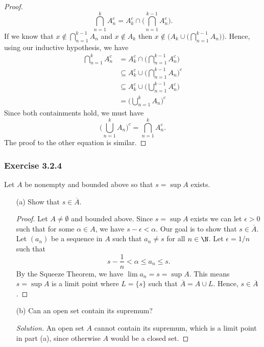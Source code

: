 \begin{proof}
\[ \bigcap_{ n=1 }^{ k } A_n^c = A_k^c \cap \Big( \bigcap_{ n=1 }^{ k-1 } A_{n}^c \Big).  \]
If we know that \( x \notin \bigcap_{ n=1 }^{ k-1 } A_{n} \) and \( x \notin A_k \) then \( x \notin \Big( A_k \cup \Big( \bigcap_{ n=1 }^{ k-1 } A_n \Big) \Big) \). Hence, using our inductive hypothesis, we have
\begin{align*}
    \bigcap_{ n=1 }^{ k } A_n^c &= A_k^c \cap \Big( \bigcap_{ n=1 }^{ k-1 } A_{n}^c \Big)  \\
                                &\subseteq A_k^c \cup \Big( \bigcap_{ n=1 }^{ k-1 } A_n \Big)^c \\ 
                                &\subseteq A_k^c \cup \Big( \bigcup_{ n=1 }^{ k-1 } A_n^c \Big) \\
                                &= \Big( \bigcup_{ n=1 }^{ k } A_n \Big)^c
\end{align*}
Since both containments hold, we must have 
\[ \Big( \bigcup_{ n=1 }^{ k }A_n  \Big)^c = \bigcap_{ n=1 }^{ k } A_n^c.  \]
The proof to the other equation is similar. 
\end{proof}







\subsubsection{Exercise 3.2.4} Let \( A  \) be nonempty and bounded above so that \( s = \sup A \) exists. 
\begin{enumerate}
    \item[(a)] Show that \( s \in \overline{A} \).
        \begin{proof}
            Let \( A \neq \emptyset \) and bounded above. Since \( s = \sup A  \) exists we can let \( \epsilon > 0  \) such that for some \( \alpha \in A  \), we have \( s - \epsilon < \alpha \). Our goal is to show that \( s \in \overline{A} \). Let \( (a_n) \) be a sequence in \( A \) such that \( a_n \neq s \) for all \( n \in \N \). Let \( \epsilon = 1/n \) such that 
            \[ s - \frac{ 1 }{ n } < \alpha \leq a_n \leq s. \]
            By the Squeeze Theorem, we have \( \lim a_n = s = \sup A \). This means \( s = \sup A \) is a limit point where \( L = \{ s \}  \) such that \( \overline{A} = A \cup L  \). Hence, \( s \in \overline{A} \).

        \end{proof}
    \item[(b)] Can an open set contain its supremum? 
        \begin{proof}[Solution]
        An open set \( A \) cannot contain its supremum, which is a limit point in part (a), since otherwise \( A \) would be a closed set.  
        \end{proof}
\end{enumerate}




